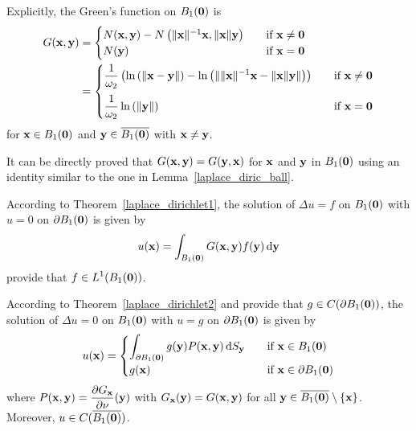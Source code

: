 Explicitly, the Green's function on $B_1(\mathbf{0})$ is
\begin{align*}
G(\mathbf{x},\mathbf{y}) &=
\begin{cases}
N(\mathbf{x},\mathbf{y}) - N\left(\|\mathbf{x}\|^{-1} \mathbf{x},\|\mathbf{x}\|\mathbf{y}\right)
& \quad \text{if} \ \mathbf{x} \neq \mathbf{0} \\
\displaystyle N(\mathbf{y}) & \quad \text{if} \ \mathbf{x} = \mathbf{0}
\end{cases} \\
&= \begin{cases}
\displaystyle \frac{1}{\omega_2} \left( \ln\left(\|\mathbf{x}-\mathbf{y}\|\right)
- \ln\left( \| \|\mathbf{x}\|^{-1} \mathbf{x}- \|\mathbf{x}\| \mathbf{y} \|\right) \right)
& \quad \text{if} \ \mathbf{x} \neq \mathbf{0} \\[1em]
\displaystyle \frac{1}{\omega_2} \ln\left(\|\mathbf{y}\|\right)
& \quad \text{if} \ \mathbf{x} = \mathbf{0}
\end{cases}
\end{align*}
for $\mathbf{x} \in B_1(\mathbf{0})$ and $\mathbf{y} \in \overline{B_1(\mathbf{0})}$
with $\mathbf{x} \neq \mathbf{y}$.

\begin{rmk}
It can be directly proved that $G(\mathbf{x},\mathbf{y}) = G(\mathbf{y},\mathbf{x})$
for $\mathbf{x}$ and $\mathbf{y}$ in $B_1(\mathbf{0})$ using an identity
similar to the one in Lemma~\ref{laplace_diric_ball}.
\end{rmk}

According to Theorem~\ref{laplace_dirichlet1}, the solution of
$\Delta u = f$ on $B_1(\mathbf{0})$ with $u = 0$ on
$\partial B_1(\mathbf{0})$ is given by
\[
u(\mathbf{x}) = \int_{B_1(\mathbf{0})} G(\mathbf{x},\mathbf{y})f(\mathbf{y}) \,\mathrm{d}{\mathbf{y}}
\]
provide that $\displaystyle f\in L^1(B_1(\mathbf{0}))$.

According to Theorem~\ref{laplace_dirichlet2} and provide that
$g\in C(\partial B_1(\mathbf{0}))$, the solution of
$\Delta u = 0$ on $B_1(\mathbf{0})$ with $u = g$ on $\partial B_1(\mathbf{0})$
is given by
\[
u(\mathbf{x}) =
\begin{cases}
\displaystyle
\int_{\partial B_1(\mathbf{0})} g(\mathbf{y}) P(\mathbf{x},\mathbf{y}) \,\mathrm{d}{S}_{\mathbf{y}} &
\quad \text{if} \ \mathbf{x} \in B_1(\mathbf{0}) \\
g(\mathbf{x}) & \quad \text{if} \ \mathbf{x} \in \partial B_1(\mathbf{0})
\end{cases}
\]
where
$\displaystyle P(\mathbf{x},\mathbf{y}) =
\frac{\partial{G_{\mathbf{x}}}}{\partial \mathbf{\nu}}(\mathbf{y})$ with
$G_{\mathbf{x}}(\mathbf{y}) = G(\mathbf{x},\mathbf{y})$ for all
$\mathbf{y} \in \overline{B_1(\mathbf{0})} \setminus \{\mathbf{x}\}$.  Moreover,
$u \in C(\overline{B_1(\mathbf{0})})$.

